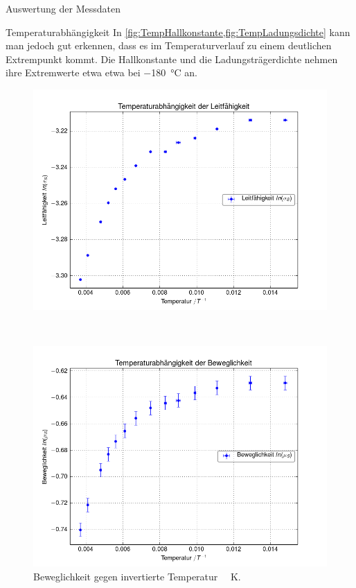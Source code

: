 \documentclass[pdftex, a4paper,11pt, twoside, ngerman]{report}
\begin{document}
\begin{chapter}{Auswertung der Messdaten}
\begin{section}{Temperaturabhängigkeit}
      In \cref{fig:TempHallkonstante,fig:TempLadungsdichte} kann man jedoch gut
      erkennen, dass es im Temperaturverlauf zu einem deutlichen Extrempunkt
      kommt.
      Die Hallkonstante und die Ladungsträgerdichte nehmen ihre Extremwerte etwa
      etwa bei \SI{-180}{\celsius} an.
      
      \begin{figure}[p]
        \centering
        \begin{minipage}{.92\textwidth}
          \centering
          \includegraphics[width=\textwidth]{Figures/Temp_Leitfaehigkeit.png}
          \caption{Leitfähigkeit gegen invertierte Temperatur
              \SI{}{\per\kelvin}.}
          \label{fig:TempLeifaehigkeit}
        \end{minipage}\\
        \begin{minipage}{.92\textwidth}
          \centering
          \includegraphics[width=\textwidth]{Figures/Temp_Beweglichkeit.png}
          \caption{Beweglichkeit gegen invertierte Temperatur
              \SI{}{\per\kelvin}.}
          \label{fig:TempBeweglichkeit}
        \end{minipage}
      \end{figure}
      

\end{section}
\end{chapter}
\end{document}
